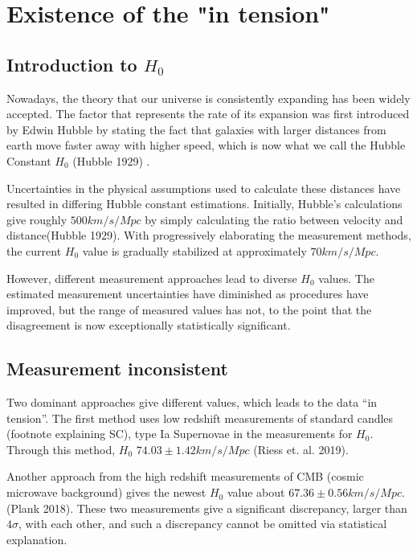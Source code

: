 \section{Existence of the "in tension"} \label{sec:outline}
\subsection{\label{sec:level2}Introduction to $H_0$}
Nowadays, the theory that our universe is consistently expanding has been widely accepted. The factor that represents the rate of its expansion was first introduced by Edwin Hubble by stating the fact that galaxies with larger distances from earth move faster away with higher speed, which is now what we call the Hubble Constant $H_0$ (Hubble 1929) \cite{H1929}. 

 Uncertainties in the physical assumptions used to calculate these distances have resulted in differing Hubble constant estimations. Initially, Hubble’s calculations give roughly $500 km/s/Mpc$ by simply calculating the ratio between velocity and distance(Hubble 1929)\cite{H1929}. With progressively elaborating the measurement methods, the current $H_0$ value is gradually stabilized at approximately $70 km/s/Mpc$. 

However, different measurement approaches lead to diverse $H_0$ values. The estimated measurement uncertainties have diminished as procedures have improved, but the range of measured values has not, to the point that the disagreement is now exceptionally statistically significant.


\subsection{\label{sec:level2}Measurement inconsistent}
Two dominant approaches give different values, which leads to the data “in tension”. The first method uses low redshift measurements of standard candles (footnote explaining SC), type Ia Supernovae in the measurements for $H_0$. Through this method, $H_0$  $74.03 \pm 1.42 km/s/Mpc$  (Riess et. al. 2019).

Another approach from the high redshift measurements of CMB (cosmic microwave background) gives the newest $H_0$ value about $67.36 \pm 0.56km/s/Mpc$. (Plank 2018). These two measurements give a significant discrepancy, larger than $4 \sigma$, with each other, and such a discrepancy cannot be omitted via statistical explanation.


